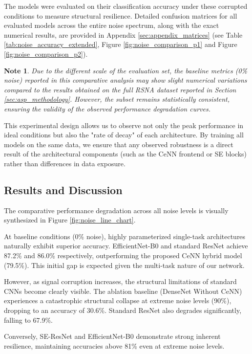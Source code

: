 \documentclass[a4paper,fleqn]{cas-dc}
\newtheorem*{note}{Note}
\begin{document}
The models were evaluated on their classification accuracy under these corrupted conditions to measure structural resilience. Detailed confusion matrices for all evaluated models across the entire noise spectrum, along with the exact numerical results, are provided in Appendix \ref{sec:appendix_matrices} (see Table \ref{tab:noise_accuracy_extended}, Figure \ref{fig:noise_comparison_p1} and Figure \ref{fig:noise_comparison_p2}).

\begin{note}
	Due to the different scale of the evaluation set, the baseline metrics (0\% noise) reported in this comparative analysis may show slight numerical variations compared to the results obtained on the full RSNA dataset reported in Section \ref{sec:asp_methodology}. However, the subset remains statistically consistent, ensuring the validity of the observed performance degradation curves.
\end{note}


This experimental design allows us to observe not only the peak performance in ideal conditions but also the "rate of decay" of each architecture. By training all models on the same data, we ensure that any observed robustness is a direct result of the architectural components (such as the CeNN frontend or SE blocks) rather than differences in data exposure.

\subsection{Results and Discussion}
The comparative performance degradation across all noise levels is visually synthesized in Figure \ref{fig:noise_line_chart}.

At baseline conditions (0\% noise), highly parameterized single-task architectures naturally exhibit superior accuracy. EfficientNet-B0 and standard ResNet achieve 87.2\% and 86.0\% respectively, outperforming the proposed CeNN hybrid model (79.5\%). This initial gap is expected given the multi-task nature of our network.

However, as signal corruption increases, the structural limitations of standard CNNs become clearly visible. The ablation baseline (DenseNet Without CeNN) experiences a catastrophic structural collapse at extreme noise levels (90\%), dropping to an accuracy of 30.6\%. Standard ResNet also degrades significantly, falling to 67.9\%. 

Conversely, SE-ResNet and EfficientNet-B0 demonstrate strong inherent resilience, maintaining accuracies above 81\% even at extreme noise levels.
\end{document}
